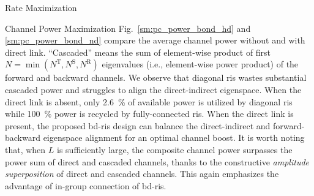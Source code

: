\documentclass[journal]{IEEEtran}
\begin{document}
\begin{section}{Rate Maximization}
\begin{subsection}{Channel Power Maximization}
		Fig.~\ref{sm:pc_power_bond_hd} and \ref{sm:pc_power_bond_nd} compare the average channel power without and with direct link.
		``Cascaded'' means the sum of element-wise product of first $N = \min(N^\mathrm{T}, N^\mathrm{S}, N^\mathrm{R})$ eigenvalues (i.e., element-wise power product) of the forward and backward channels.
		We observe that diagonal \gls{ris} wastes substantial cascaded power and struggles to align the direct-indirect eigenspace.
		When the direct link is absent, only \qty{2.6}{\percent} of available power is utilized by diagonal \gls{ris} while \qty{100}{\percent} power is recycled by fully-connected \gls{ris}.
		When the direct link is present, the proposed \gls{bd}-\gls{ris} design can balance the direct-indirect and forward-backward eigenspace alignment for an optimal channel boost.
		It is worth noting that, when $L$ is sufficiently large, the composite channel power surpasses the power sum of direct and cascaded channels, thanks to the constructive \emph{amplitude superposition} of direct and cascaded channels.
		This again emphasizes the advantage of in-group connection of \gls{bd}-\gls{ris}.



\end{subsection}
\end{section}
\end{document}
